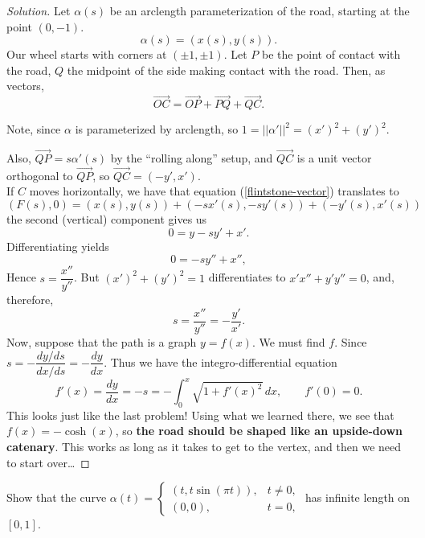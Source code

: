 \documentclass[Shifrin_Solutions_Spring_2018]{subfiles}
\begin{document}
\begin{proof}[Solution]
Let $\alpha(s)$ be an arclength parameterization of the road, starting at the point $(0,-1)$.
\[
\alpha(s) = ( x(s), y(s) ).
\]
Our wheel starts with corners at $(\pm 1, \pm 1)$. Let $P$ be the point of contact with the road, $Q$ the midpoint of the side making contact with the road. Then, as vectors,
\begin{equation}\label{flintstone-vector}
\overrightarrow{OC} = \overrightarrow{OP} + \overrightarrow{PQ} + \overrightarrow{QC}.
\end{equation}

Note, since $\alpha$ is parameterized by arclength, so $1=||\alpha'||^2=(x')^2+(y')^2$.

Also, $\overrightarrow{QP} = s\alpha'(s)$ by the ``rolling along'' setup, and $\overrightarrow{QC}$ is a unit vector orthogonal to $\overrightarrow{QP}$, so $\overrightarrow{QC} = (-y', x')$.\\

If $C$ moves horizontally, we have that equation (\ref{flintstone-vector}) translates to
\[
(F(s), 0 ) = (x(s), y(s) ) + (-s x'(s) , -sy'(s) ) + (-y'(s), x'(s) )
\]
the second (vertical) component gives us
\[
0 = y -s y' + x' .
\]
Differentiating yields
\[
0 = -s y'' + x'' ,
\]
Hence $s = \dfrac{x''}{y''}$.  But $(x')^2 + (y')^2 = 1$ differentiates to $x'x'' + y' y'' = 0$, and, therefore,
\[
s = \dfrac{x''}{y''} = - \dfrac{y'}{x'} .
\]
Now, suppose that the path is a graph $y=f(x)$. We must find $f$. Since $s = - \dfrac{dy/ds}{dx/ds} = -\dfrac{dy}{dx}$. Thus we have the integro-differential equation
\[
f'(x) = \dfrac{dy}{dx} = -s = - \int_0^x \sqrt{1 + f'(x)^2 }\, dx, \qquad f'(0) = 0.
\]
This looks just like the last problem! Using what we learned there, we see that $f(x) = -\cosh(x)$, so \textbf{the road should be shaped like an upside-down catenary}. This works as long as it takes to get to the vertex, and then we need to start over\dots
\end{proof}




\begin{exercise}
Show that the curve $\alpha(t) = \left\{ \begin{matrix}\left(t, t \sin(\pi t)\right), & t \neq 0, \\ (0,0), & t = 0, \end{matrix} \right. $ has infinite length on $[0,1]$.
\end{exercise}
\end{document}
